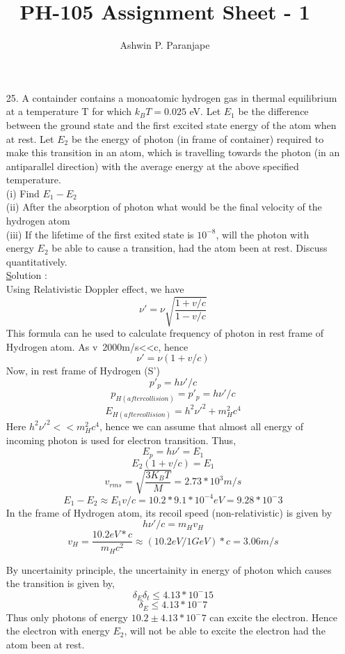 \documentclass[10pt, a4paper]{article}
\begin{document}
\title{PH-105 Assignment Sheet - 1}
\author{Ashwin P. Paranjape}
\date{}
\maketitle
\begin{enumerate}
\item[25.]{A containder contains a monoatomic hydrogen gas in thermal equilibrium at a temperature T for which $k_BT= 0.025$ eV. Let $E_1$ be the difference between the ground state and the first excited state energy of the atom when at rest. Let $E_2$ be the energy of photon (in frame of container) required to make this transition in an atom, which is travelling towards the photon (in an antiparallel direction) with the average energy at the above specified temperature.\\
(i) Find $E_1 - E_2$\\
(ii) After the absorption of photon what would be the final velocity of the hydrogen atom\\
(iii) If the lifetime of the first exited state is $10^{-8}$, will the photon with energy $E_2$ be able to cause a transition, had the atom been at rest. Discuss quantitatively.} \\
{\underline Solution} : \\
Using Relativistic Doppler effect, we have
\[\nu'=\nu\sqrt{\frac{1+v/c}{1-v/c}}\]
This formula can he used to calculate frequency of photon in rest frame of Hydrogen atom. As v~2000m/s<<c, hence
\[\nu'=\nu(1+v/c)\]
Now, in rest frame of Hydrogen (S')
\[p'_p = h\nu'/c\]
\[p_{H(after collision)}= p'_p= h\nu'/c\]
\[E_{H(after collision)}= h^2\nu'^2 + m_H^2c^4\]
Here $h^2\nu'^2 << m_H^2c^4$, hence we can assume that almost all energy of incoming photon is used for electron transition.
Thus,
\[E_p=h\nu'=E_1\]
\[E_2(1+v/c)=E_1\]
\[v_{rms}=\sqrt{\frac{3K_BT}{M}}=2.73*10^3 m/s\]
\[E_1-E_2\approx E_1v/c=10.2*9.1*10^{-4} eV = 9.28*10^-3\]
In the frame of Hydrogen atom, its recoil speed (non-relativistic) is given by
\[h\nu'/c=m_Hv_H\]
\[v_H=\frac{10.2eV *c}{m_H c^2}\approx (10.2eV /1GeV)*c = 3.06 m/s\]

By uncertainity principle, the uncertainity in energy of photon which causes the transition is given by,
\[\delta_E \delta_t \leq 4.13 * 10 ^ -15\]
\[\delta_E \leq 4.13 * 10 ^ -7 \]
Thus only photons of energy $10.2 \pm 4.13 * 10 ^ -7$ can excite the electron.
Hence the electron with energy $E_2$, will not be able to excite the electron had the atom been at rest.
\end{enumerate}
\end{document}
